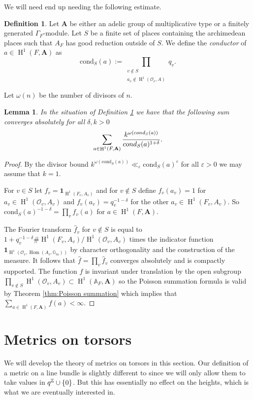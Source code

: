 \documentclass[a4paper,11pt,reqno]{amsart}
\newcommand{\G}{\mathbb{G}}
\newcommand{\A}{\mathbb{A}}
\DeclareMathOperator{\Hom}{Hom}
\DeclareMathOperator{\HH}{H}
\newtheorem{lemma}[theorem]{Lemma}
\theoremstyle{definition}
\newtheorem{definition}[theorem]{Definition}
\begin{document}
We will need end up needing the following estimate.
\begin{definition}\label{def:conductor}
	Let $\mathbf{A}$ be either an adelic group of multiplicative type or a finitely generated $\Gamma_F$-module. Let $S$ be a finite set of places containing the archimedean places such that $A_F$ has good reduction outside of $S$. We define the \emph{conductor} of $a \in \HH^1(F, \mathbf{A})$ as 
	\[
	\text{cond}_S(a) := \prod_{\substack{v \not \in S \\ a_v \not \in \HH^1(\mathcal{O}_v, A)}} q_v.
	\]
\end{definition}
Let $\omega(n)$ be the number of divisors of $n$.
\begin{lemma}\label{lem:Bounds for conductor sums}
	In the situation of Definition \ref{def:conductor} we have that the following sum converges absolutely for all $\delta, k > 0$ 
	\[
	\sum_{a \in \HH^1(F, \mathbf{A})}
	\frac{k^{\omega(\emph{cond}_S(a))}}{\emph{cond}_S(a)^{1 + \delta}}.
	\]
\end{lemma}
\begin{proof}
	By the divisor bound $k^{\omega(\text{cond}_S(a))} \ll_{\varepsilon} \text{cond}_S(a)^{\varepsilon}$ for all $\varepsilon > 0$ we may assume that $k = 1$.
	
	For $v \in S$ let $f_v = \mathbf{1}_{\HH^1(F_v, A_v)}$ and for $v \not \in S$ define $f_v(a_v) = 1$ for $a_v \in \HH^1(\mathcal{O}_v, A_v)$ and $f_v(a_v) = q_v^{-1 - \delta}$ for the other $a_v \in \HH^1(F_v, A_v)$. So $\text{cond}_S(a)^{-1 - \delta} = \prod_v f_v(a)$ for $a \in \HH^1(F, \mathbf{A})$.
	
	The Fourier transform $\hat{f}_v$ for $v \not \in S$ is equal to $1 + q_v^{-1 - \delta} \# \HH^1(F_v, A_v)/\HH^1(\mathcal{O}_v, A_v)$ times the indicator function $\mathbf{1}_{\HH^1(\mathcal{O}_v, \Hom(A_v, \G_m))}$ by character orthogonality and the construction of the measure. It follows that $\hat{f} = \prod_v \hat{f}_v$ converges absolutely and is compactly supported. The function $f$ is invariant under translation by the open subgroup $\prod_{v \not \in S} \HH^1(\mathcal{O}_v, A_v) \subset \HH^1(\A_F, \mathbf{A})$ so the Poisson summation formula is valid by Theorem \ref{thm:Poisson summation} which implies that $\sum_{a \in \HH^1(F, \mathbf{A})} f(a) < \infty$.
\end{proof}
\section{Metrics on torsors}
We will develop the theory of metrics on torsors in this section. Our definition of a metric on a line bundle is slightly different to \cite[\S2.1.3]{Chambert-Loir2010Igusa} since we will only allow them to take values in $q^{\mathbb{Z}} \cup \{0\}$. But this has essentially no effect on the heights, which is what we are eventually interested in.
\end{document}
